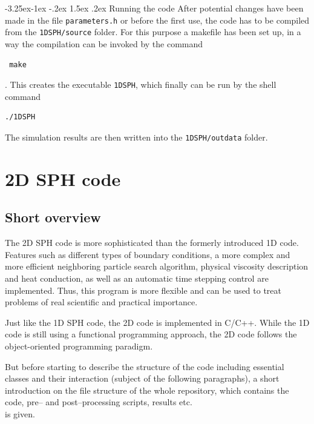 \documentclass{report}
\makeatletter
\renewcommand\paragraph{\@startsection{paragraph}{4}{\z@}%
  {-3.25ex\@plus -1ex \@minus -.2ex}%
  {1.5ex \@plus .2ex}%
  {\normalfont\normalsize\bfseries}}
\makeatother
\begin{document}
\paragraph{Running the code}
After potential changes have been made in the file {\tt parameters.h} or before the first use, the code has to be compiled from the {\tt 1DSPH/source} folder. For this purpose a makefile has been set up, in a way the compilation can be invoked by the command
\begin{verbatim}
 make
\end{verbatim}.
This creates the executable {\tt 1DSPH}, which finally can be run by the shell command
\begin{verbatim}
./1DSPH
\end{verbatim}
The simulation results are then written into the {\tt 1DSPH/outdata} folder.



\section{2D SPH code}
\label{sec:2DSPHcode}
\subsection{Short overview}
\label{sec:shortOverview2D}
The 2D SPH code is more sophisticated than the formerly introduced 1D code. Features such as different types of boundary conditions, a more complex and more efficient neighboring particle search algorithm, physical viscosity description and heat conduction, as well as an automatic time stepping control are implemented. Thus, this program is more flexible and can be used to treat problems of real scientific and practical importance. 

Just like the 1D SPH code, the 2D code is implemented in C/C++. While the 1D code is still using a functional programming approach, the 2D code follows the object-oriented programming paradigm.

But before starting to describe the structure of the code including essential classes and their interaction (subject of the following paragraphs), a short introduction on the file structure of the whole repository, which contains the code, pre-- and post--processing scripts, results etc.\\ is given.
\end{document}
